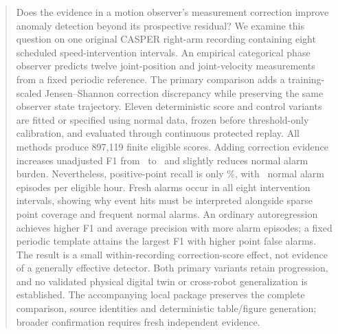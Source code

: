 \begin{abstract}
Does the evidence in a motion observer's measurement correction improve anomaly detection beyond its prospective residual? We examine this question on one original CASPER right-arm recording containing eight scheduled speed-intervention intervals. An empirical categorical phase observer predicts twelve joint-position and joint-velocity measurements from a fixed periodic reference. The primary comparison adds a training-scaled Jensen--Shannon correction discrepancy while preserving the same observer state trajectory. Eleven deterministic score and control variants are fitted or specified using normal data, frozen before threshold-only calibration, and evaluated through continuous protected replay. All methods produce 897,119 finite eligible scores. Adding correction evidence increases unadjusted F1 from \RFone\ to \RCFone\ and slightly reduces normal alarm burden. Nevertheless, positive-point recall is only \RCRecallPct\%, with \RCEpisodeRate\ normal alarm episodes per eligible hour. Fresh alarms occur in all eight intervention intervals, showing why event hits must be interpreted alongside sparse point coverage and frequent normal alarms. An ordinary autoregression achieves higher F1 and average precision with more alarm episodes; a fixed periodic template attains the largest F1 with higher point false alarms. The result is a small within-recording correction-score effect, not evidence of a generally effective detector. Both primary variants retain progression, and no validated physical digital twin or cross-robot generalization is established. The accompanying local package preserves the complete comparison, source identities and deterministic table/figure generation; broader confirmation requires fresh independent evidence.
\end{abstract}
